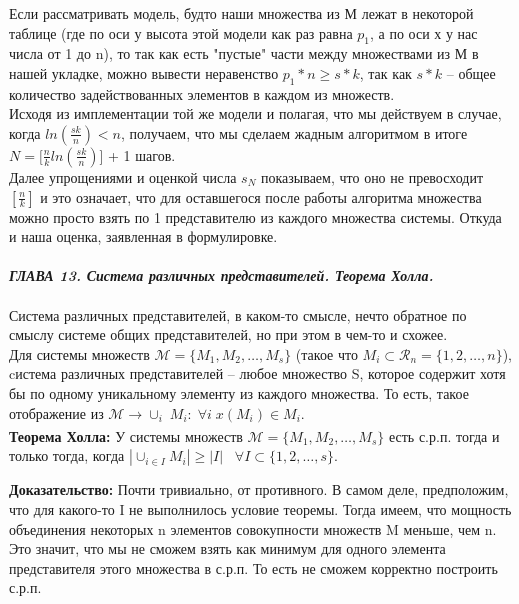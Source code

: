 \documentclass[12pt]{article}
\begin{document}
Если рассматривать модель, будто наши множества из М лежат в некоторой таблице (где по оси у высота этой модели как раз равна \(p_1\), а по оси х у нас числа от 1 до n), то так как есть "пустые" части между множествами из М в нашей укладке, можно вывести неравенство \(p_1 * n \geq s * k\), так как \(s * k\) -- общее количество задействованных элементов в каждом из множеств. \\

Исходя из имплементации той же модели и полагая, что мы действуем в случае, когда \(ln(\frac{sk}{n}) < n\), получаем, что мы сделаем жадным алгоритмом в итоге \(N = [\frac{n}{k}ln(\frac{sk}{n})\)] + 1 шагов.\\

Далее упрощениями и оценкой числа \(s_N\) показываем, что оно не превосходит \([\frac{n}{k}]\) и это означает, что для оставшегося после работы алгоритма множества можно просто взять по 1 представителю из каждого множества системы. Откуда и наша оценка, заявленная в формулировке.
\\
\newpage
\\
\textbf{\textit{ГЛАВА 13. Система различных представителей. Теорема Холла.}}
\\
\\

Система различных представителей, в каком-то смысле, нечто обратное по смыслу системе общих представителей, но при этом в чем-то и схожее. \\

Для системы множеств \(\mathcal{M} = \{M_1, M_2, \dots, M_s\}\) (такое что \(M_i \subset \mathcal{R}_{n} = \{1, 2, \dots, n\}\)),  cистема различных представителей -- любое множество S, которое содержит хотя бы по одному уникальному элементу из каждого множества. То есть, такое отображение из \(\mathcal{M} \xrightarrow[]{} \cup_{i} \;M_i: \; \forall i \; x(M_i) \in M_i\). \\

\textbf{Теорема Холла:} У системы множеств \(\mathcal{M} = \{M_1, M_2, \dots, M_s\}\) есть с.р.п. тогда и только тогда, когда \(|\cup_{i \in I} M_i| \geq |I| \;\;\; \forall I \subset \{1, 2, \dots, s\}\).

\textbf{Доказательство:} Почти тривиально, от противного. В самом деле, предположим, что для какого-то I не выполнилось условие теоремы. Тогда имеем, что мощность объединения некоторых n элементов совокупности множеств M меньше, чем n. Это значит, что мы не сможем взять как минимум для одного элемента представителя этого множества в с.р.п. То есть не сможем корректно построить с.р.п.
\end{document}
